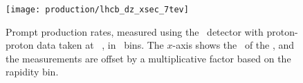\begin{figure}
  \centering
  \texttt{[image: production/lhcb\_dz\_xsec\_7tev]}
  \caption{%
    Prompt \PDzero production rates, measured using the \lhcb\ detector with 
    proton-proton data taken at ~\cite{LHCb-PAPER-2012-041}, in 
    \pTy\ bins.
    The $x$-axis shows the \pT\ of the \PDzero, and the measurements are offset 
    by a multiplicative factor based on the rapidity bin.
  }
  \label{fig:prod:theory:comparisons:7tev}
\end{figure}
